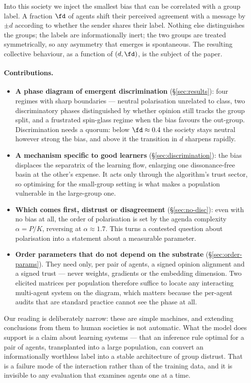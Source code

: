 Into this society we inject the smallest bias that can be correlated with a group
label. A fraction $\fd$ of agents shift their perceived agreement with a message
by $\pm d$ according to whether the sender shares their label. Nothing else
distinguishes the groups; the labels are informationally inert; the two groups are
treated symmetrically, so any asymmetry that emerges is spontaneous. The
resulting collective behaviour, as a function of $(d,\fd)$, is the subject of the
paper.

\paragraph{Contributions.}
\begin{itemize}\itemsep1pt
  \item \textbf{A phase diagram of emergent discrimination}
    (\S\ref{sec:results}): four regimes with sharp boundaries --- neutral
    polarisation unrelated to class, two discriminatory phases distinguished by
    whether opinion still tracks the group split, and a frustrated spin-glass
    regime when the bias favours the out-group. Discrimination needs a quorum:
    below $\fd\approx0.4$ the society stays neutral however strong the bias, and
    above it the transition in $d$ sharpens rapidly.
  \item \textbf{A mechanism specific to good learners}
    (\S\ref{sec:discrimination}): the bias displaces the separatrix of the
    learning flow, enlarging one dissonance-free basin at the other's expense.
    It acts only through the algorithm's trust sector, so optimising for the
    small-group setting is what makes a population vulnerable in the large-group
    one.
  \item \textbf{Which comes first, distrust or disagreement}
    (\S\ref{sec:no-disc}): even with no bias at all, the order of polarisation is
    set by the agenda
    complexity $\alpha=P/K$, reversing at $\alpha\approx1.7$. This turns a
    contested question about polarisation
    \citep{fiorina2008polarization,iyengar2012affect} into a statement about a
    measurable parameter.
  \item \textbf{Order parameters that do not depend on the substrate}
    (\S\ref{sec:order-params}). They need only, per pair of agents, a signed
    opinion alignment and a signed trust --- never weights, gradients or the
    embedding dimension. Two elicited matrices per population therefore suffice to
    locate any interacting multi-agent system on the diagram, which matters because
    the per-agent audits that are standard practice cannot see the phase at all.
\end{itemize}

Our reading is deliberately narrow: these are simple machines, and extending
conclusions from them to human societies is not automatic. What the model does
support is a claim about learning systems --- that an inference rule optimal for a
pair of agents, transplanted into a large population, can convert an
informationally worthless label into a stable architecture of group distrust. That
is a failure mode of the interaction rather than of the training data, and it is
invisible to any evaluation that examines agents one at a time.
